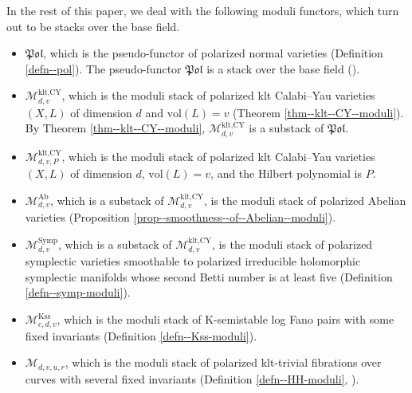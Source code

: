 \documentclass[12pt,twoside]{amsart}
\theoremstyle{definition}
\begin{document}
In the rest of this paper, we deal with the following moduli functors, which turn out to be stacks over the base field. 

\begin{itemize}
\item
$\mathfrak{Pol}$, which is the pseudo-functor of polarized normal varieties (Definition \ref{defn--pol}). 
The pseudo-functor $\mathfrak{Pol}$ is a stack over the base field (\cite[Lemma 2.15]{HH}). 

\item
$\mathcal{M}^{\text{klt,CY}}_{d,v}$, which is the moduli stack of polarized klt Calabi--Yau varieties $(X,L)$ of dimension $d$ and $\mathrm{vol}(L)=v$ (Theorem  \ref{thm--klt--CY--moduli}). 
By Theorem  \ref{thm--klt--CY--moduli}, $\mathcal{M}^{\text{klt,CY}}_{d,v}$ is a substack of $\mathfrak{Pol}$. 

\item
$\mathcal{M}^{\text{klt,CY}}_{d,v,P}$, which is the moduli stack of polarized klt Calabi--Yau varieties $(X,L)$ of dimension $d$, $\mathrm{vol}(L)=v$, and the Hilbert polynomial is $P$. 



\item
$\mathcal{M}^{\mathrm{Ab}}_{d,v}$, which is a substack of $\mathcal{M}^{\text{klt,CY}}_{d,v}$, is the moduli stack of polarized Abelian varieties (Proposition \ref{prop--smoothness--of--Abelian--moduli}). 

\item
$\mathcal{M}^{\mathrm{Symp}}_{d,v}$, which is a substack of $\mathcal{M}^{\text{klt,CY}}_{d,v}$, is the moduli stack of polarized symplectic varieties smoothable to polarized irreducible holomorphic symplectic manifolds whose second Betti number is at least five (Definition \ref{defn--symp-moduli}). 

\item
$\mathcal{M}^{\mathrm{Kss}}_{c,d,v}$, which is the moduli stack of K-semistable log Fano pairs with some fixed invariants (Definition \ref{defn--Kss-moduli}). 

\item
$\mathcal{M}_{d, v, u, r}$, which is the moduli stack of polarized klt-trivial fibrations over curves with several fixed invariants (Definition \ref{defn--HH-moduli}, \cite[Theorem 1.3]{HH}). 
\end{itemize}
\end{document}
